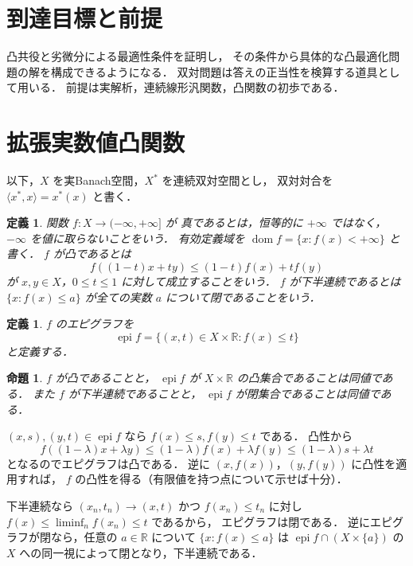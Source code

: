\documentclass[a5paper,10pt,onecolumn]{jsarticle}
\makeatletter
\theoremstyle{mathnotetheorem}
\newtheorem{definition}[theorem]{定義}
\newtheorem{proposition}[theorem]{命題}
\renewcommand{\proofname}{証明}
\renewenvironment{proof}[1][\proofname]{%
  \par\pushQED{\qed}\normalfont\topsep4\p@\@plus2\p@\relax
  \trivlist\item[\hskip\labelsep\bfseries #1]\ignorespaces
}{\popQED\endtrivlist\@endpefalse}
\makeatother
\begin{document}
\section*{到達目標と前提}
凸共役と劣微分による最適性条件を証明し，
その条件から具体的な凸最適化問題の解を構成できるようになる．
双対問題は答えの正当性を検算する道具として用いる．
前提は実解析，連続線形汎関数，凸関数の初歩である．

\section{拡張実数値凸関数}

以下，$X$ を実Banach空間，$X^*$ を連続双対空間とし，
双対対合を $\langle x^*,x\rangle=x^*(x)$ と書く．

\begin{definition}
関数 $f:X\to(-\infty,+\infty]$ が
\emph{真}であるとは，恒等的に $+\infty$ ではなく，
$-\infty$ を値に取らないことをいう．
有効定義域を
$\operatorname{dom}f=\{x:f(x)<+\infty\}$ と書く．
$f$ が\emph{凸}であるとは
\[
 f((1-t)x+ty)\le(1-t)f(x)+tf(y)
\]
が $x,y\in X$，$0\le t\le1$ に対して成立することをいう．
$f$ が\emph{下半連続}であるとは
$\{x:f(x)\le a\}$ が全ての実数 $a$ について閉であることをいう．
\end{definition}

\begin{definition}
$f$ の\emph{エピグラフ}を
\[
 \operatorname{epi}f
 =\{(x,t)\in X\times\mathbb R:f(x)\le t\}
\]
と定義する．
\end{definition}

\begin{proposition}\label{prop:epi}
$f$ が凸であることと，
$\operatorname{epi}f$ が $X\times\mathbb R$ の凸集合であることは同値である．
また $f$ が下半連続であることと，
$\operatorname{epi}f$ が閉集合であることは同値である．
\end{proposition}
\begin{proof}
$(x,s),(y,t)\in\operatorname{epi}f$ なら
$f(x)\le s,f(y)\le t$ である．
凸性から
\[
 f((1-\lambda)x+\lambda y)
 \le(1-\lambda)f(x)+\lambda f(y)
 \le(1-\lambda)s+\lambda t
\]
となるのでエピグラフは凸である．
逆に $(x,f(x))$，$(y,f(y))$ に凸性を適用すれば，
$f$ の凸性を得る（有限値を持つ点について示せば十分）．

下半連続なら
$(x_n,t_n)\to(x,t)$ かつ $f(x_n)\le t_n$ に対し
$f(x)\le\liminf_nf(x_n)\le t$ であるから，
エピグラフは閉である．
逆にエピグラフが閉なら，任意の $a\in\mathbb R$ について
$\{x:f(x)\le a\}$ は
$\operatorname{epi}f\cap(X\times\{a\})$
の $X$ への同一視によって閉となり，下半連続である．
\end{proof}
\end{document}
